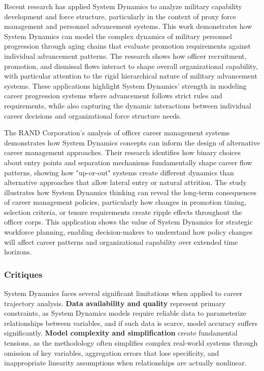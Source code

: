 \documentclass[main.tex]{subfiles}
\begin{document}

Recent research has applied System Dynamics to analyze military capability development and force structure, particularly in the context of proxy force management and personnel advancement systems\parencite{military_capability}. This work demonstrates how System Dynamics can model the complex dynamics of military personnel progression through aging chains that evaluate promotion requirements against individual advancement patterns. The research shows how officer recruitment, promotion, and dismissal flows interact to shape overall organizational capability, with particular attention to the rigid hierarchical nature of military advancement systems. These applications highlight System Dynamics' strength in modeling career progression systems where advancement follows strict rules and requirements, while also capturing the dynamic interactions between individual career decisions and organizational force structure needs.


The RAND Corporation's analysis of officer career management systems demonstrates how System Dynamics concepts can inform the design of alternative career management approaches\parencite{rand_officer}. Their research identifies how binary choices about entry points and separation mechanisms fundamentally shape career flow patterns, showing how "up-or-out" systems create different dynamics than alternative approaches that allow lateral entry or natural attrition. The study illustrates how System Dynamics thinking can reveal the long-term consequences of career management policies, particularly how changes in promotion timing, selection criteria, or tenure requirements create ripple effects throughout the officer corps. This application shows the value of System Dynamics for strategic workforce planning, enabling decision-makers to understand how policy changes will affect career patterns and organizational capability over extended time horizons.

\subsubsection{Critiques}

System Dynamics faces several significant limitations when applied to career trajectory analysis. \textbf{Data availability and quality} represent primary constraints, as System Dynamics models require reliable data to parameterize relationships between variables, and if such data is scarce, model accuracy suffers significantly\parencite{sd_limitations}. \textbf{Model complexity and simplification} create fundamental tensions, as the methodology often simplifies complex real-world systems through omission of key variables, aggregation errors that lose specificity, and inappropriate linearity assumptions when relationships are actually nonlinear\parencite{sd_limitations}.
\end{document}
